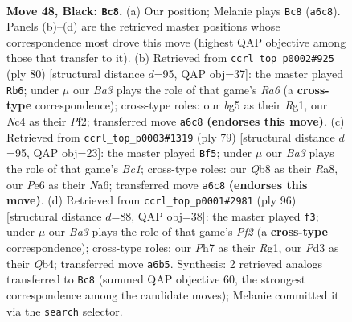\documentclass[11pt]{article}
\begin{document}
\clearpage

\begin{figure}[p]\centering
\begin{subfigure}{0.46\textwidth}\centering
\resizebox{\linewidth}{!}{%
\newchessgame
\chessboard[
  setfen={1q6/r4k1p/b3p2Q/p2pPpB1/P1n4P/3p4/2R5/RN2N1K1 b - - 0 48},
  showmover=false,
  pgfstyle=straightmove, color=movearrow, markmove={a6-c8}
]}
\caption{}
\end{subfigure}\hfill
\begin{subfigure}{0.46\textwidth}\centering
\resizebox{\linewidth}{!}{%
\newchessgame
\chessboard[
  setfen={2r4k/4b1r1/R2p4/P3p2p/2P1qp2/3p1N1P/1Q3PP1/6RK w - - 1 41},
  showmover=false,
  pgfstyle=straightmove, color=movearrow, markmove={a6-b6}
]}
\caption{}
\end{subfigure}
\\[4pt]
\begin{subfigure}{0.46\textwidth}\centering
\resizebox{\linewidth}{!}{%
\newchessgame
\chessboard[
  setfen={r1b5/2p4k/n2p1P1p/R2P4/2P2N2/4Bq1p/3Q3K/8 b - - 1 40},
  showmover=false,
  pgfstyle=straightmove, color=movearrow, markmove={c8-f5}
]}
\caption{}
\end{subfigure}\hfill
\begin{subfigure}{0.46\textwidth}\centering
\resizebox{\linewidth}{!}{%
\newchessgame
\chessboard[
  setfen={2q3k1/p4p2/P5p1/3p3p/1Q1Nb3/2r1P2P/5PP1/6RK w - - 1 49},
  showmover=false,
  pgfstyle=straightmove, color=movearrow, markmove={f2-f3}
]}
\caption{}
\end{subfigure}
\caption{\textbf{Move 48, Black: \texttt{Bc8}.} (a) Our position; Melanie plays \texttt{Bc8} (\texttt{a6c8}). Panels (b)--(d) are the retrieved master positions whose correspondence most drove this move (highest QAP objective among those that transfer to it). (b) Retrieved from \texttt{ccrl\_top\_p0002\#925} (ply 80) [structural distance $d$=95, QAP obj=37]: the master played \texttt{Rb6}; under $\mu$ our \emph{Ba3} plays the role of that game's \emph{Ra6} (a \textbf{cross-type} correspondence); cross-type roles: our \emph{b}g5 as their \emph{R}g1, our \emph{N}c4 as their \emph{P}f2; transferred move \texttt{a6c8} \textbf{(endorses this move)}. (c) Retrieved from \texttt{ccrl\_top\_p0003\#1319} (ply 79) [structural distance $d$=95, QAP obj=23]: the master played \texttt{Bf5}; under $\mu$ our \emph{Ba3} plays the role of that game's \emph{Bc1}; cross-type roles: our \emph{Q}b8 as their \emph{R}a8, our \emph{P}e6 as their \emph{N}a6; transferred move \texttt{a6c8} \textbf{(endorses this move)}. (d) Retrieved from \texttt{ccrl\_top\_p0001\#2981} (ply 96) [structural distance $d$=88, QAP obj=38]: the master played \texttt{f3}; under $\mu$ our \emph{Ba3} plays the role of that game's \emph{Pf2} (a \textbf{cross-type} correspondence); cross-type roles: our \emph{P}h7 as their \emph{R}g1, our \emph{P}d3 as their \emph{Q}b4; transferred move \texttt{a6b5}. Synthesis: 2 retrieved analogs transferred to \texttt{Bc8} (summed QAP objective 60, the strongest correspondence among the candidate moves); Melanie committed it via the \texttt{search} selector.}
\label{fig:thought-m95}
\end{figure}
\end{document}
